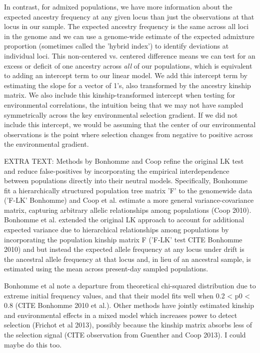 \documentclass[12pt]{report}
\begin{document}
In contrast, for admixed populations, we have more information about the expected ancestry frequency at any given locus than just the observations at that locus in our sample. The expected ancestry frequency is the same across all loci in the genome and we can use a genome-wide estimate of the expected admixture proportion (sometimes called the 'hybrid index') to identify deviations at individual loci. This non-centered vs. centered difference means we can test for an excess or deficit of one ancestry across \textit{all} of our populations, which is equivalent to adding an intercept term to our linear model. We add this intercept term by estimating the slope for a vector of 1's, also transformed by the ancestry kinship matrix. We also include this kinship-transformed intercept when testing for environmental correlations, the intuition being that we may not have sampled symmetrically across the key environmental selection gradient. If we did not include this intercept, we would be assuming that the center of our environmental observations is the point where selection changes from negative to positive across the environmental gradient.



EXTRA TEXT:
Methods by Bonhomme and Coop refine the original LK test and reduce false-positives by incorporating the empirical interdependence between populations directly into their neutral models. Specifically, Bonhomme fit a hierarchically structured population tree matrix 'F' to the genomewide data ('F-LK' Bonhomme) and Coop et al. estimate a more general variance-covariance matrix, capturing arbitrary allelic relationships among populations (Coop 2010). Bonhomme et al. extended the original LK approach to account for additional expected variance due to hierarchical relationships among populations by incorporating the population kinship matrix F ('F-LK' test CITE Bonhomme 2010) and  
but instead the expected allele frequency at any locus under drift is the ancestral allele frequency at that locus and, in lieu of an ancestral sample, is estimated using the mean across present-day sampled populations. 

Bonhomme et al note a departure from theoretical chi-squared distribution due to extreme initial frequency values, and that their model fits well when 0.2 < p0 < 0.8 (CITE Bonhomme 2010 et al.).
Other methods have jointly estimated kinship and environmental effects in a mixed model which increases power to detect selection (Frichot et al 2013), possibly because the kinship matrix absorbs less of the selection signal (CITE observation from Guenther and Coop 2013). I could maybe do this too.
\end{document}
